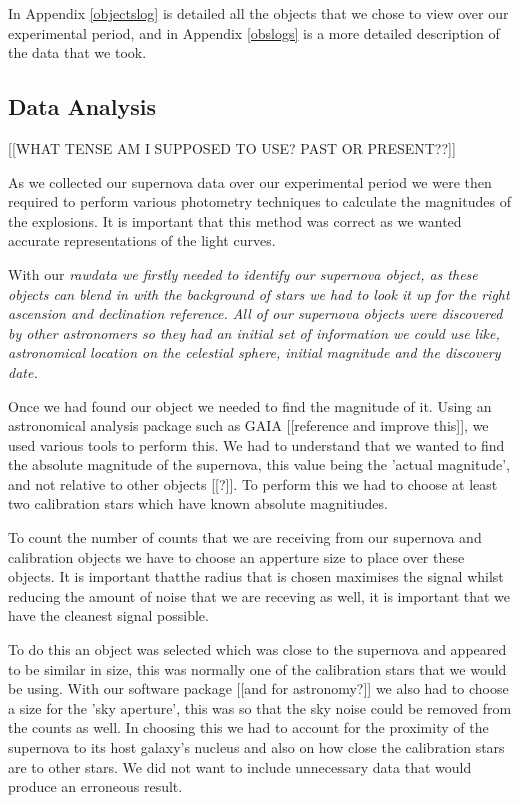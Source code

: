 \documentclass[twocolumn]{revtex4}
\begin{document}
In Appendix \ref{objectslog} is detailed all the objects that we chose to view over our experimental period, and in Appendix \ref{obslogs} is a more detailed description of the data that we took.

\vspace{-3ex}
\subsection{Data Analysis}
\vspace{-2ex}

[[WHAT TENSE AM I SUPPOSED TO USE? PAST OR PRESENT??]]

As we collected our supernova data over our experimental period we were then required to perform various photometry techniques to calculate the magnitudes of the explosions. It is important that this method was correct as we wanted accurate representations of the light curves. 

With our \em{raw}\em data we firstly needed to identify our supernova object, as these objects can blend in with the background of stars we had to look it up for the right ascension and declination reference. All of our supernova objects were discovered by other astronomers so they had an initial set of information we could use like, astronomical location on the celestial sphere, initial magnitude and the discovery date.

Once we had found our object we needed to find the magnitude of it. Using an astronomical analysis package such as GAIA [[reference and improve this]], we used various tools to perform this. We had to understand that we wanted to find the absolute magnitude of the supernova, this value being the 'actual magnitude', and not relative to other objects [[?]]. To perform this we had to choose at least two calibration stars which have known absolute magnitiudes.

To count the number of counts that we are receiving from our supernova and calibration objects we have to choose an apperture size to place over these objects. It is important thatthe radius that is chosen maximises the signal whilst reducing the amount of noise that we are receving as well, it is important that we have the cleanest signal possible.

To do this an object was selected which was close to the supernova and appeared to be similar in size, this was normally one of the calibration stars that we would be using. With our software package [[and for astronomy?]] we also had to choose a size for the 'sky aperture', this was so that the sky noise could be removed from the counts as well. In choosing this we had to account for the proximity of the supernova to its host galaxy's nucleus and also on how close the calibration stars are to other stars. We did not want to include unnecessary data that would produce an erroneous result. 
\end{document}
